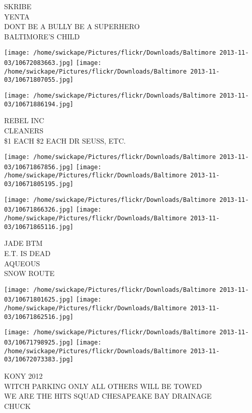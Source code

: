 \documentclass[10pt,letterpaper]{article}
\begin{document}
SKRIBE\\
YENTA\\
DONT BE A BULLY BE A SUPERHERO\\
BALTIMORE'S CHILD\\
\pagebreak

\texttt{[image: /home/swickape/Pictures/flickr/Downloads/Baltimore 2013-11-03/10672083663.jpg]}
\texttt{[image: /home/swickape/Pictures/flickr/Downloads/Baltimore 2013-11-03/10671807055.jpg]}

\vspace{0.25in}
\texttt{[image: /home/swickape/Pictures/flickr/Downloads/Baltimore 2013-11-03/10671886194.jpg]}

REBEL INC\\
CLEANERS\\
\$1 EACH \$2 EACH DR SEUSS, ETC.\\
\pagebreak

\texttt{[image: /home/swickape/Pictures/flickr/Downloads/Baltimore 2013-11-03/10671867856.jpg]}
\texttt{[image: /home/swickape/Pictures/flickr/Downloads/Baltimore 2013-11-03/10671805195.jpg]}

\texttt{[image: /home/swickape/Pictures/flickr/Downloads/Baltimore 2013-11-03/10671866326.jpg]}
\texttt{[image: /home/swickape/Pictures/flickr/Downloads/Baltimore 2013-11-03/10671865116.jpg]}

JADE BTM\\
E.T. IS DEAD\\
AQUEOUS\\
SNOW ROUTE\\
\pagebreak

\texttt{[image: /home/swickape/Pictures/flickr/Downloads/Baltimore 2013-11-03/10671801625.jpg]}
\texttt{[image: /home/swickape/Pictures/flickr/Downloads/Baltimore 2013-11-03/10671862516.jpg]}

\texttt{[image: /home/swickape/Pictures/flickr/Downloads/Baltimore 2013-11-03/10671798925.jpg]}
\texttt{[image: /home/swickape/Pictures/flickr/Downloads/Baltimore 2013-11-03/10672073383.jpg]}

KONY 2012\\
WITCH PARKING ONLY ALL OTHERS WILL BE TOWED\\
WE ARE THE HITS SQUAD CHESAPEAKE BAY DRAINAGE\\
CHUCK\\
\pagebreak
\end{document}
